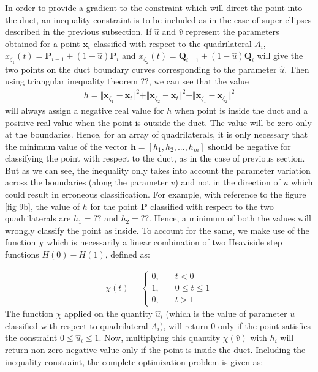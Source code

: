 \documentclass[12pt,a4]{article}
\begin{document}
In order to provide a gradient to the constraint which will direct the point into the duct, an inequality constraint is to be included as in the case of super-ellipses described in the previous subsection. If $\hat{u}$ and $\hat{v}$ represent the parameters obtained for a point $\mathbf{x}_t$ classified with respect to the quadrilateral $A_i$, $x_{\zeta_1}(t) = \mathbf{P}_{i-1}+\left(1-{\hat{u}} \right)\mathbf{P}_i$ and $x_{\zeta_2}(t) = \mathbf{Q}_{i-1}+\left(1-{\hat{u}} \right)\mathbf{Q}_i$ will give the two points on the duct boundary curves corresponding to the parameter $\hat{u}$. Then using triangular inequality theorem ??, we can see that the value
\begin{align}
\label{eq:ductgradientinquad}
h = \Vert \mathbf{x}_{\zeta_1}-\mathbf{x}_t\Vert^2+\Vert \mathbf{x}_{\zeta_2}-\mathbf{x}_t\Vert^2-\Vert \mathbf{x}_{\zeta_1}- \mathbf{x}_{\zeta_2}\Vert^2
\end{align}
will always assign a negative real value for $h$ when point is inside the duct and a positive real value when the point is outside the duct. The value will be zero only at the boundaries. Hence, for an array of quadrilaterals, it is only necessary that the minimum value of the vector $\mathbf{h} = [{h}_1, {h}_2,...,{h}_m]$ should be negative for classifying the point with respect to the duct, as in the case of previous section. But as we can see, the inequality only takes into account the parameter variation across the boundaries (along the parameter $v$) and not in the direction of $u$ which could result in erroneous classification. For example, with reference to the figure [fig 9b], the value of $h$ for the point $\mathbf{P}$ classified with respect to the two quadrilaterals are $h_1 = ??$ and $h_2 = ??$. Hence, a minimum of both the values will wrongly classify the point as inside. To account for the same, we make use of the function $\chi$ which is necessarily a linear combination of two Heaviside step functions $H(0)-H(1)$, defined as:

\begin{align}
\label{eq:chifunction}
\chi(t) = \left\lbrace \begin{matrix}
0,&\quad t<0 \\
1,&\quad 0\leq t \leq 1\\
0, &\quad t >1
\end{matrix}\right.
\end{align}
The function $\chi$ applied on the quantity $\hat{u}_i$ (which is the value of parameter ${u}$ classified with respect to quadrilateral $A_i$), will return 0 only if the point satisfies the constraint $0\leq \hat{u}_i\leq 1$. Now, multiplying this quantity $\chi(\hat{v})$ with $h_i$ will return non-zero negative value only if the point is inside the duct. Including the inequality constraint, the complete optimization problem is given as:
\end{document}
